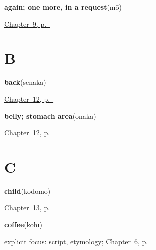 \noindent\begin{minipage}[t]{\linewidth}
\raggedright
\textbf{again; one more, in a request}\enspace\emph{}\enspace(mō)\par
\footnotesize \hyperref[ch:ja-repeat-please]{Chapter~9, p.~\pageref*{ch:ja-repeat-please}}
\end{minipage}\par\smallskip

\section*{B}

\noindent\begin{minipage}[t]{\linewidth}
\raggedright
\textbf{back}\enspace\emph{}\enspace(senaka)\par
\footnotesize \hyperref[ch:ja-body-seven-more]{Chapter~12, p.~\pageref*{ch:ja-body-seven-more}}
\end{minipage}\par\smallskip

\noindent\begin{minipage}[t]{\linewidth}
\raggedright
\textbf{belly; stomach area}\enspace\emph{}\enspace(onaka)\par
\footnotesize \hyperref[ch:ja-body-seven-more]{Chapter~12, p.~\pageref*{ch:ja-body-seven-more}}
\end{minipage}\par\smallskip

\section*{C}

\noindent\begin{minipage}[t]{\linewidth}
\raggedright
\textbf{child}\enspace\emph{}\enspace(kodomo)\par
\footnotesize \hyperref[ch:ja-family-nine]{Chapter~13, p.~\pageref*{ch:ja-family-nine}}
\end{minipage}\par\smallskip

\noindent\begin{minipage}[t]{\linewidth}
\raggedright
\textbf{coffee}\enspace\emph{}\enspace(kōhī)\par
\footnotesize explicit focus: script, etymology; \hyperref[ch:ja-koohii-katakana]{Chapter~6, p.~\pageref*{ch:ja-koohii-katakana}}
\end{minipage}\par\smallskip

